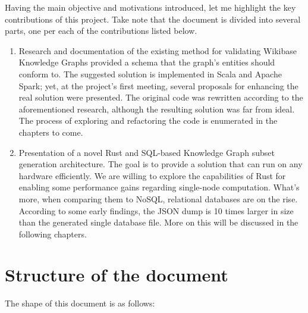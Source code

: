Having the main objective and motivations introduced, let me highlight the key contributions of this project. Take note that the document is divided into several parts, one per each of the contributions listed below.

\begin{enumerate}
    \itemsep0.5em
    \item Research and documentation of the existing method for validating Wikibase Knowledge Graphs provided a schema that the graph's entities should conform to. The suggested solution is implemented in Scala and Apache Spark; yet, at the project's first meeting, several proposals for enhancing the real solution were presented. The original code was rewritten according to the aforementioned research, although the resulting solution was far from ideal. The process of exploring and refactoring the code is enumerated in the chapters to come.
    \item Presentation of a novel Rust and SQL-based Knowledge Graph subset generation architecture. The goal is to provide a solution that can run on any hardware efficiently. We are willing to explore the capabilities of Rust for enabling some performance gains regarding single-node computation. What's more, when comparing them to NoSQL, relational databases are on the rise. According to some early findings, the JSON dump is 10 times larger in size than the generated single database file. More on this will be discussed in the following chapters.
\end{enumerate}

\section{Structure of the document}

The shape of this document is as follows:


